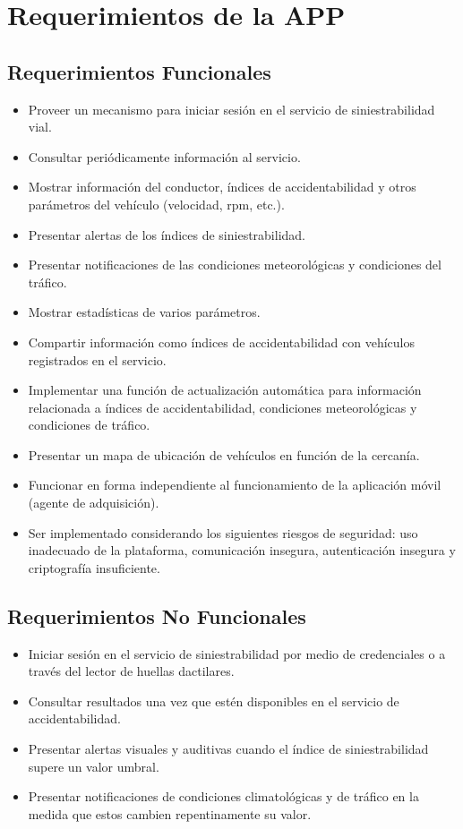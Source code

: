 \documentclass[a4paper,10pt, oneside, titlepage]{article}
\begin{document}
	\section{Requerimientos de la APP}
	\subsection{Requerimientos Funcionales}
	\begin{itemize}
		\item Proveer un mecanismo para iniciar sesión en el servicio de siniestrabilidad vial.
		\item Consultar periódicamente información al servicio.
		\item Mostrar información del conductor, índices de accidentabilidad y otros parámetros del vehículo (velocidad, rpm, etc.).
		\item Presentar alertas de los índices de siniestrabilidad.
		\item Presentar notificaciones de las condiciones meteorológicas y condiciones del tráfico.
		\item Mostrar estadísticas de varios parámetros.
		\item Compartir información como índices de accidentabilidad con vehículos registrados en el servicio.
		\item Implementar una función de actualización automática para información relacionada a índices de accidentabilidad, condiciones meteorológicas y condiciones de tráfico.
		\item Presentar un mapa de ubicación de vehículos en función de la cercanía.
		\item Funcionar en forma independiente al funcionamiento de la aplicación móvil (agente de adquisición).
		\item Ser implementado considerando los siguientes riesgos de seguridad: uso inadecuado de la plataforma, comunicación insegura, autenticación insegura y criptografía insuficiente.
	\end{itemize}
	\subsection{Requerimientos No Funcionales}
	\begin{itemize}
		\item Iniciar sesión en el servicio de siniestrabilidad por medio de credenciales o a través del lector de huellas dactilares.
		\item Consultar resultados una vez que estén disponibles en el servicio de accidentabilidad.
		\item Presentar alertas visuales y auditivas cuando el índice de siniestrabilidad supere un valor umbral.
		\item Presentar notificaciones de condiciones climatológicas y de tráfico en la medida que estos cambien repentinamente su valor.
	\end{itemize}
	
\end{document}

